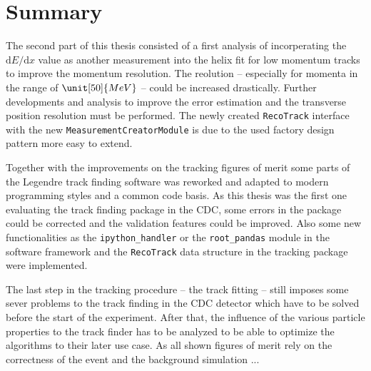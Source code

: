 \chapter*{Summary}


The second part of this thesis consisted of a first analysis of incorperating the $\mathrm dE/\mathrm d x$ value as another measurement into the helix fit for low momentum tracks to improve the momentum resolution. The reolution -- especially for momenta in the range of $\unit[50]{MeV}$ -- could be increased drastically. Further developments and analysis to improve the error estimation and the transverse position resolution must be performed. The newly created \texttt{RecoTrack} interface with the new \texttt{MeasurementCreatorModule} is due to the used factory design pattern more easy to extend.

Together with the improvements on the tracking figures of merit some parts of the Legendre track finding software was reworked and adapted to modern programming styles and a common code basis. As this thesis was the first one evaluating the track finding package in the CDC, some errors in the package could be corrected and the validation features could be improved. Also some new functionalities as the \texttt{ipython\_handler} or the \texttt{root\_pandas} module in the software framework and the \texttt{RecoTrack} data structure in the tracking package were implemented.

The last step in the tracking procedure -- the track fitting -- still imposes some sever problems to the track finding in the CDC detector which have to be solved before the start of the experiment. After that, the influence of the various particle properties to the track finder has to be analyzed to be able to optimize the algorithms to their later use case. As all shown figures of merit rely on the correctness of the event and the background simulation ...